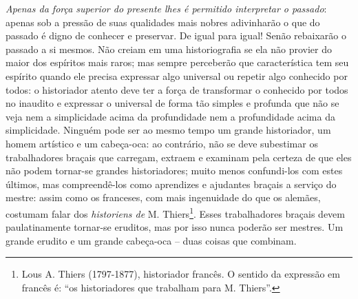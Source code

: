 \emph{Apenas da força superior do presente lhes é permitido interpretar
o passado}: apenas sob a pressão de suas qualidades mais nobres
adivinharão o que do passado é digno de conhecer e preservar. De igual
para igual! Senão rebaixarão o passado a si mesmos. Não creiam em uma
historiografia se ela não provier do maior dos espíritos mais raros; mas
sempre perceberão que característica tem seu espírito quando ele precisa
expressar algo universal ou repetir algo conhecido por todos: o
historiador atento deve ter a força de transformar o conhecido por todos
no inaudito e expressar o universal de forma tão simples e profunda que
não se veja nem a simplicidade acima da profundidade nem a profundidade
acima da simplicidade. Ninguém pode ser ao mesmo tempo um grande
historiador, um homem artístico e um cabeça-oca: ao contrário, não se
deve subestimar os trabalhadores braçais que carregam, extraem e
examinam pela certeza de que eles não podem tornar-se grandes
historiadores; muito menos confundi-los com estes últimos, mas
compreendê-los como aprendizes e ajudantes braçais a serviço do mestre:
assim como os franceses, com mais ingenuidade do que os alemães,
costumam falar dos \emph{historiens de} M. Thiers\footnote{Lous A.
  Thiers (1797-1877), historiador francês. O sentido da expressão em
  francês é: ``os historiadores que trabalham para M. Thiers''.}. Esses
trabalhadores braçais devem paulatinamente tornar-se eruditos, mas por
isso nunca poderão ser mestres. Um grande erudito e um grande cabeça-oca
-- duas coisas que combinam.

